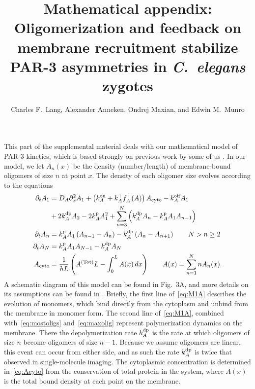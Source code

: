 \documentclass[11pt]{article}
\title{Mathematical appendix: \\ Oligomerization and feedback on membrane recruitment stabilize PAR-3 asymmetries in \emph{C.\ elegans} zygotes}
\author{Charles F.\ Lang, Alexander Anneken,  Ondrej Maxian, and Edwin M.\ Munro }
\date{}
\newcommand{\6}[1]{#1_{\text{6}}}
\newcommand{\3}[1]{#1_{\text{3}}}
\newcommand{\Tot}[1]{#1^\text{(Tot)}}
\newcommand{\A}[1]{#1_A}
\begin{document}
\maketitle
This part of the supplemental material deals with our mathematical model of PAR-3 kinetics, which is based strongly on previous work by some of us \cite{lang2022oligomerization}. In our model, we let $A_n(x)$ be the density (number/length) of membrane-bound oligomers of size $n$ at point $x$. The density of each oligomer size evolves according to the equations
\cite[Eq.~(1)]{lang2022oligomerization}
\begin{subequations}
\label{eq:P3model}
\begin{align}
\label{eq:M1A}
\Dt \MA & = \A{D} \Dx^2 \MA + \left(\A{\kon}+\A{\kf}\A{f}^+(A)\right)  \MAC  - \koff_A \MA \\ \nonumber &+ 2\A{\kdp}A_2 -2\A{\kp} \MA^2+ \sum_{n=3}^N  \left(\A{\kdp}A_{n}-\A{\kp}\MA A_{n-1}\right) \\
\label{eq:mostoligs}
\Dt A_n & =\A{\kp}\MA \left(A_{n-1}-A_n\right)- \A{\kdp}\left(A_n-A_{n+1}\right) \qquad N > n \geq 2 \\ 
\label{eq:maxolig}
\Dt A_N & =\A{\kp}\MA A_{N-1}- \A{\kdp}A_N \\  \label{eq:Acyto}
A_\text{cyto} & = \frac{1}{h L} \left(\Tot{A} L - \int_0^L A(x) \, dx \right) \qquad A(x) =\sum_{n=1}^N n A_n(x).
\end{align}
\end{subequations}
A schematic diagram of this model can be found in Fig.\ 3A, and more details on its assumptions can be found in \cite{lang2022oligomerization}. Briefly, the first line of\ \eqref{eq:M1A} describes the evolution of monomers, which bind directly from the cytoplasm and unbind from the membrane in monomer form. The second line of\ \eqref{eq:M1A}, combined with\ \eqref{eq:mostoligs} and\ \eqref{eq:maxolig} represent polymerization dynamics on the membrane. There the depolymerization rate $k^\text{dp}_A$ is the rate at which oligomers of size $n$ become oligomers of size $n-1$. Because we assume oligomers are linear, this event can occur from either side, and as such the rate $k^\text{dp}_A$ is twice that observed in single-molecule imaging.  The cytoplasmic concentration is determined in\ \eqref{eq:Acyto} from the conservation of total protein in the system, where $A(x)$ is the total bound density at each point on the membrane.  
\end{document}
